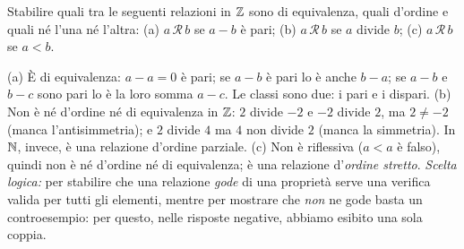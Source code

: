 \begin{esercizio}
Stabilire quali tra le seguenti relazioni in $\mathbb{Z}$ sono di equivalenza, quali d'ordine e
quali né l'una né l'altra: (a) $a\,\mathcal{R}\,b$ se $a-b$ è pari; (b)
$a\,\mathcal{R}\,b$ se $a$ divide $b$; (c) $a\,\mathcal{R}\,b$ se $a<b$.
\begin{soluzione}
(a) È di equivalenza: $a-a=0$ è pari; se $a-b$ è pari lo è anche $b-a$; se $a-b$ e
$b-c$ sono pari lo è la loro somma $a-c$. Le classi sono due: i pari e i dispari.
(b) Non è né d'ordine né di equivalenza in $\mathbb{Z}$: $2$ divide $-2$ e $-2$ divide $2$, ma
$2\neq-2$ (manca l'antisimmetria); e $2$ divide $4$ ma $4$ non divide $2$ (manca la
simmetria). In $\mathbb{N}$, invece, è una relazione d'ordine parziale. (c) Non è riflessiva
($a<a$ è falso), quindi non è né d'ordine né di equivalenza; è una relazione
d'\emph{ordine stretto}. \emph{Scelta logica:} per stabilire che una relazione
\emph{gode} di una proprietà serve una verifica valida per tutti gli elementi, mentre per
mostrare che \emph{non} ne gode basta un controesempio: per questo, nelle risposte
negative, abbiamo esibito una sola coppia.
\end{soluzione}
\end{esercizio}
